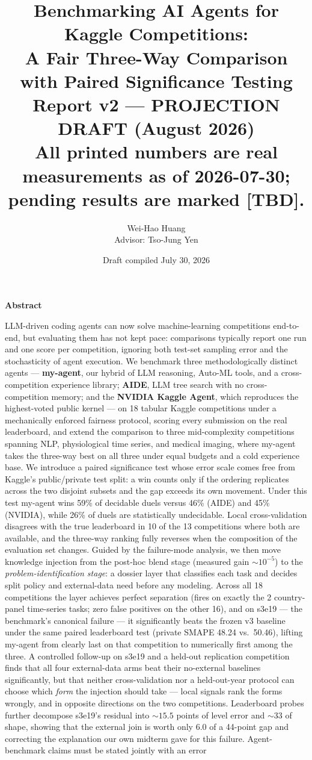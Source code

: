 \documentclass[11pt,a4paper]{article}
\title{\textbf{Benchmarking AI Agents for Kaggle Competitions:\\
A Fair Three-Way Comparison with Paired Significance Testing}\\
\large Report v2 --- PROJECTION DRAFT (August 2026)\\
\normalsize\textcolor{orange!85!black}{All printed numbers are real measurements as of 2026-07-30; pending results are marked [TBD].}}
\author{Wei-Hao Huang\\\small Advisor: Tso-Jung Yen}
\date{Draft compiled July 30, 2026}
\begin{document}
\maketitle

\begin{center}\textbf{\large Abstract}\end{center}
\noindent LLM-driven coding agents can now solve machine-learning competitions end-to-end, but evaluating them has not kept pace: comparisons typically report one run and one score per competition, ignoring both test-set sampling error and the stochasticity of agent execution. We benchmark three methodologically distinct agents --- \textbf{my-agent}, our hybrid of LLM reasoning, Auto-ML tools, and a cross-competition experience library; \textbf{AIDE}, LLM tree search with no cross-competition memory; and the \textbf{NVIDIA Kaggle Agent}, which reproduces the highest-voted public kernel --- on 18 tabular Kaggle competitions under a mechanically enforced fairness protocol, scoring every submission on the real leaderboard, and extend the comparison to three mid-complexity competitions spanning NLP, physiological time series, and medical imaging, where my-agent takes the three-way best on all three under equal budgets and a cold experience base. We introduce a paired significance test whose error scale comes free from Kaggle's public/private test split: a win counts only if the ordering replicates across the two disjoint subsets and the gap exceeds its own movement. Under this test my-agent wins 59\% of decidable duels versus 46\% (AIDE) and 45\% (NVIDIA), while 26\% of duels are statistically undecidable. Local cross-validation disagrees with the true leaderboard in 10 of the 13 competitions where both are available, and the three-way ranking fully reverses when the composition of the evaluation set changes. Guided by the failure-mode analysis, we then move knowledge injection from the post-hoc blend stage (measured gain ${\sim}10^{-5}$) to the \emph{problem-identification stage}: a dossier layer that classifies each task and decides split policy and external-data need before any modeling. Across all 18 competitions the layer achieves perfect separation (fires on exactly the 2 country-panel time-series tasks; zero false positives on the other 16), and on s3e19 --- the benchmark's canonical failure --- it significantly beats the frozen v3 baseline under the same paired leaderboard test (private SMAPE 48.24 vs.\ 50.46), lifting my-agent from clearly last on that competition to numerically first among the three. A controlled follow-up on s3e19 and a held-out replication competition finds that all four external-data arms beat their no-external baselines significantly, but that neither cross-validation nor a held-out-year protocol can choose which \emph{form} the injection should take --- local signals rank the forms wrongly, and in opposite directions on the two competitions. Leaderboard probes further decompose s3e19's residual into ${\sim}15.5$ points of level error and ${\sim}33$ of shape, showing that the external join is worth only $6.0$ of a 44-point gap and correcting the explanation our own midterm gave for this failure. Agent-benchmark claims must be stated jointly with an error 
\end{document}
